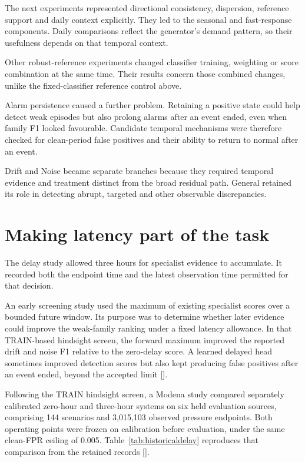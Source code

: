 The next experiments represented directional consistency, dispersion, reference support and daily context explicitly. They led to the seasonal and fast-response components. Daily comparisons reflect the generator's demand pattern, so their usefulness depends on that temporal context.

Other robust-reference experiments changed classifier training, weighting or score combination at the same time. Their results concern those combined changes, unlike the fixed-classifier reference control above.

Alarm persistence caused a further problem. Retaining a positive state could help detect weak episodes but also prolong alarms after an event ended, even when family F1 looked favourable. Candidate temporal mechanisms were therefore checked for clean-period false positives and their ability to return to normal after an event.

Drift and Noise became separate branches because they required temporal evidence and treatment distinct from the broad residual path. General retained its role in detecting abrupt, targeted and other observable discrepancies.

\section{Making latency part of the task}
The delay study allowed three hours for specialist evidence to accumulate. It recorded both the endpoint time and the latest observation time permitted for that decision.

An early screening study used the maximum of existing specialist scores over a bounded future window. Its purpose was to determine whether later evidence could improve the weak-family ranking under a fixed latency allowance. In that TRAIN-based hindsight screen, the forward maximum improved the reported drift and noise F1 relative to the zero-delay score. A learned delayed head sometimes improved detection scores but also kept producing false positives after an event ended, beyond the accepted limit [].

Following the TRAIN hindsight screen, a Modena study compared separately calibrated zero-hour and three-hour systems on six held evaluation sources, comprising 144 scenarios and 3,015,103 observed pressure endpoints. Both operating points were frozen on calibration before evaluation, under the same clean-FPR ceiling of 0.005. Table~\ref{tab:historicaldelay} reproduces that comparison from the retained records [].

